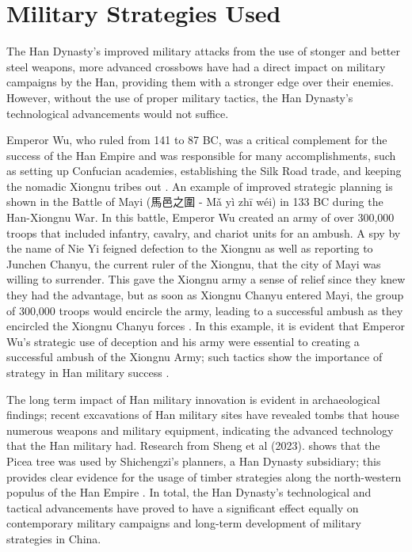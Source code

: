 \documentclass{ctexart}
\begin{document}
\section{Military Strategies Used}
The Han Dynasty’s improved military attacks from the use of stonger and better steel weapons, more advanced crossbows have had a direct impact on military campaigns by the Han, providing them with a stronger edge over their enemies. However, without the use of proper military tactics, the Han Dynasty’s technological advancements would not suffice.

Emperor Wu, who ruled from 141 to 87 BC, was a critical complement for the success of the Han Empire and was responsible for many accomplishments, such as setting up Confucian academies, establishing the Silk Road trade, and keeping the nomadic Xiongnu tribes out \cite{chinahighlights_wudi}. An example of improved strategic planning is shown in the Battle of Mayi (馬邑之圍 - Mǎ yì zhī wéi) in 133 BC during the Han-Xiongnu War. In this battle, Emperor Wu created an army of over 300,000 troops that included infantry, cavalry, and chariot units for an ambush. A spy by the name of Nie Yi feigned defection to the Xiongnu as well as reporting to Junchen Chanyu, the current ruler of the Xiongnu, that the city of Mayi was willing to surrender. This gave the Xiongnu army a sense of relief since they knew they had the advantage, but as soon as Xiongnu Chanyu entered Mayi, the group of 300,000 troops would encircle the army, leading to a successful ambush as they encircled the Xiongnu Chanyu forces \cite{paludan_1998_chronicle}. In this example, it is evident that Emperor Wu’s strategic use of deception and his army were essential to creating a successful ambush of the Xiongnu Army; such tactics show the importance of strategy in Han military success \cite{chineseuniversityofhongkong_the}\cite{msw_2019_the}.

The long term impact of Han military innovation is evident in archaeological findings; recent excavations of Han military sites have revealed tombs that house numerous weapons and military equipment, indicating the advanced technology that the Han military had. Research from Sheng et al (2023). shows that the Picea tree was used by Shichengzi’s planners, a Han Dynasty subsidiary; this provides clear evidence for the usage of timber strategies along the north-western populus of the Han Empire \cite{sheng_2023_wooduse}. In total, the Han Dynasty’s technological and tactical advancements have proved to have a significant effect equally on contemporary military campaigns and long-term development of military strategies in China\cite{ven_2021_warfare}.
\end{document}
